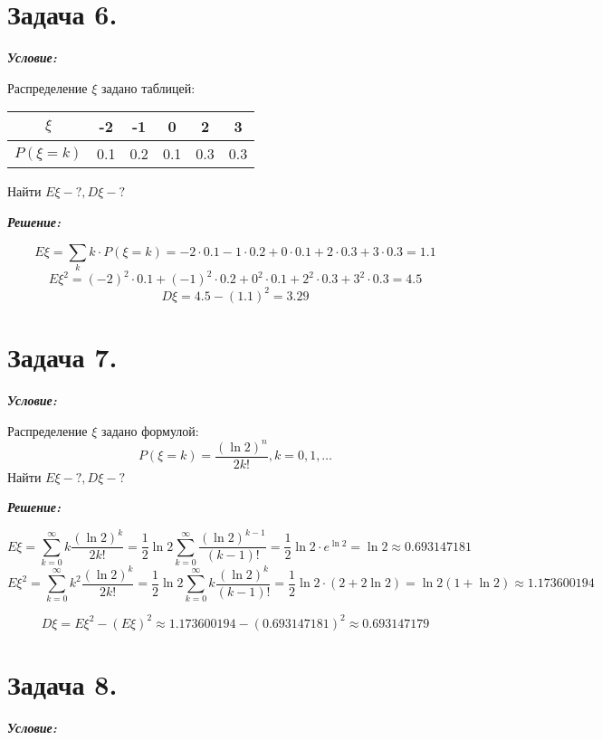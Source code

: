 \section*{Задача 6.}

\noindent\textit{\textbf{Условие:}}

Распределение $\xi$ задано таблицей:
\begin{table}[H]
	\centering
	\begin{tabular}{|c|c|c|c|c|c|}
		\hline
		$\xi$        & -2  & -1  & 0   & 2   & 3   \\ \hline
		$P(\xi = k)$ & 0.1 & 0.2 & 0.1 & 0.3 & 0.3 \\ \hline
	\end{tabular}
\end{table}
Найти $E\xi - ?, D\xi - ?$

\noindent\textit{\textbf{Решение:}}

\[
E\xi = \sum_{k} k \cdot P(\xi = k) = -2 \cdot 0.1 -1 \cdot 0.2 + 0 \cdot 0.1 + 2 \cdot 0.3 + 3 \cdot 0.3 = 1.1
\]
\[
E\xi^2 = (-2)^2 \cdot 0.1 + (-1)^2 \cdot 0.2 + 0^2 \cdot 0.1 + 2^2 \cdot 0.3 + 3^2 \cdot 0.3 = 4.5
\]
\[
D\xi = 4.5 - (1.1)^2 = 3.29
\]

\section*{Задача 7.}

\noindent\textit{\textbf{Условие:}}

Распределение $\xi$ задано формулой:
\[
P(\xi = k) = \frac{(\ln 2)^n}{2k!}, k = 0,1,\dots
\]
Найти $E\xi - ?, D\xi - ?$

\noindent\textit{\textbf{Решение:}}

\[
E\xi = \sum_{k=0}^{\infty} k \frac{(\ln 2)^k}{2k!} = \frac{1}{2} \ln 2 \sum_{k=0}^{\infty} \frac{(\ln 2)^{k-1}}{(k-1)!} = \frac{1}{2} \ln 2 \cdot e^{\ln 2} = \ln 2 \approx 0.693147181
\]
\[
E\xi^2 = \sum_{k=0}^{\infty} k^2 \frac{(\ln 2)^k}{2k!} = \frac{1}{2} \ln 2 \sum_{k=0}^{\infty} k \frac{(\ln 2)^k}{(k-1)!} = \frac{1}{2} \ln 2 \cdot (2 + 2 \ln 2) = \ln 2 (1 + \ln 2) \approx 1.173600194
\]

\[
D\xi = E\xi^2 - (E\xi)^2 \approx 1.173600194 - (0.693147181)^2 \approx 0.693147179
\]

\section*{Задача 8.}

\noindent\textit{\textbf{Условие:}}


